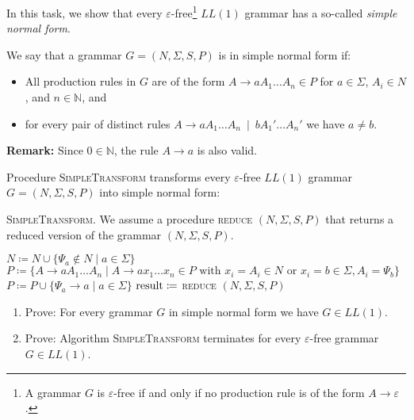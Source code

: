 \begin{exercise}{60}
In this task, we show that every $\varepsilon$-free\footnote{A grammar $G$ is $\varepsilon$-free if and only if no production rule is of the form $A \rightarrow \varepsilon$.} $LL(1)$ grammar has a so-called \emph{simple normal form}.
\par
We say that a grammar $G=(N,\Sigma,S,P)$ is in simple normal form if:
\begin{itemize}
\item All production rules in $G$ are of the form $A \rightarrow a A_1 \dots A_n \in P$ for $a\in \Sigma$, $A_i\in N$, and $n\in \mathbb{N}$, and
\item for every pair of distinct rules $A \rightarrow a A_1 \dots A_n ~\mid~ b A_1' \dots A_n'$ we have $a \neq b$.
\end{itemize}
\textbf{Remark:} Since $0\in \mathbb{N}$, the rule $A \rightarrow a$ is also valid.
\par

Procedure \textsc{SimpleTransform} transforms every $\varepsilon$-free $LL(1)$ grammar $G=(N,\Sigma,S,P)$ into simple normal form:

\begin{algorithm}
\caption{\textsc{SimpleTransform}. We assume a procedure \textsc{reduce} $(N,\Sigma,S,P)$ that returns a reduced version of the grammar $(N,\Sigma,S,P)$.}

    $N \coloneqq N \cup \{ \Psi_a \not\in N \mid a \in \Sigma \}$\;
    $P \coloneqq \{ A \rightarrow a A_1 \dots A_n \mid A \rightarrow a x_1 \dots x_n \in P \text{ with } x_i = A_i \in N \text{ or } x_i = b \in \Sigma, A_i = \Psi_b \}$\;
    $P \coloneqq P \cup \{ \Psi_a \rightarrow a \mid a \in \Sigma \}$\;
    $\textnormal{result} \coloneqq $ \textsc{reduce} $(N,\Sigma,S,P)$ \;
    \;
\end{algorithm}

\begin{enumerate}
\item Prove: For every grammar $G$ in simple normal form we have $G\in LL(1)$.
%
\item Prove: Algorithm \textsc{SimpleTransform} terminates for every $\varepsilon$-free grammar $G\in LL(1)$.


\end{enumerate}
\end{exercise}
